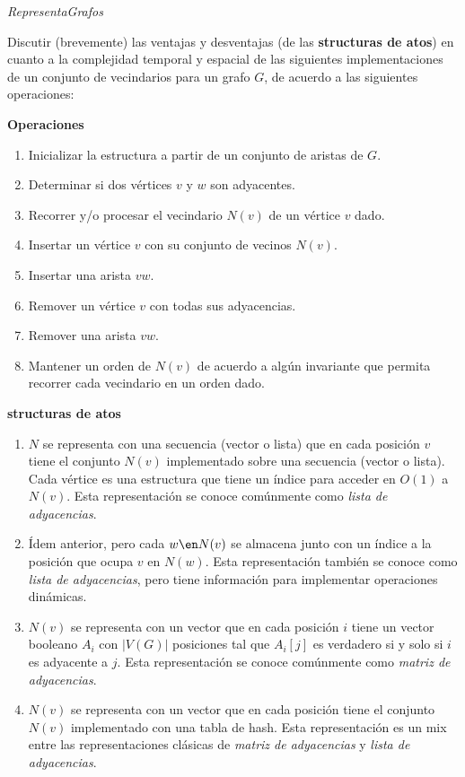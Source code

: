 \begin{enunciado}{}
  \textit{RepresentaGrafos}

  Discutir (brevemente) las ventajas y desventajas (de las \textbf{structuras de atos}) en cuanto
  a la complejidad temporal y espacial de las siguientes implementaciones de un conjunto de vecindarios
  para un grafo $G$, de acuerdo a
  las siguientes operaciones:

  \textbf{Operaciones}
  \begin{enumerate}[label=$\alph*)$, itemsep=-2pt]
    \item Inicializar la estructura a partir de un conjunto de aristas de $G$.
    \item Determinar si dos vértices $v$ y $w$ son adyacentes.
    \item Recorrer y/o procesar el vecindario $N(v)$ de un vértice $v$ dado.
    \item Insertar un vértice $v$ con su conjunto de vecinos $N(v)$.
    \item Insertar una arista $vw$.
    \item Remover un vértice $v$ con todas sus adyacencias.
    \item Remover una arista $vw$.
    \item Mantener un orden de $N(v)$ de acuerdo a algún invariante que permita recorrer cada
          vecindario en un orden dado.
  \end{enumerate}

  \textbf{structuras de atos}
  \begin{enumerate}[label=$\text{\red{ED}}_\arabic*)$, itemsep=-2pt]
    \item $N$ se representa con una secuencia (vector o lista) que en cada posición $v$ tiene el
          conjunto $N(v)$ implementado sobre una secuencia (vector o lista). Cada vértice es una
          estructura que tiene un índice para acceder en $O(1)$ a $N(v)$. Esta representación se
          conoce comúnmente como \textit{lista de adyacencias}.

    \item Ídem anterior, pero cada $w \en N(v)$ se almacena junto con un índice a la posición que
          ocupa $v$ en $N(w)$. Esta representación también se conoce como \textit{lista de adyacencias},
          pero tiene información para implementar operaciones dinámicas.

    \item $N(v)$ se representa con un vector que en cada posición $i$ tiene un vector booleano $A_i$
          con $|V (G)|$ posiciones tal que $A_i[j]$ es verdadero si y solo si $i$ es adyacente a $j$. Esta
          representación se conoce comúnmente como \textit{matriz de adyacencias}.

    \item $N(v)$ se representa con un vector que en cada posición tiene el conjunto $N(v)$ implementado
          con una tabla de hash. Esta representación es un mix entre las representaciones clásicas de
          \textit{matriz de adyacencias} y \textit{lista de adyacencias}.
  \end{enumerate}
\end{enunciado}

